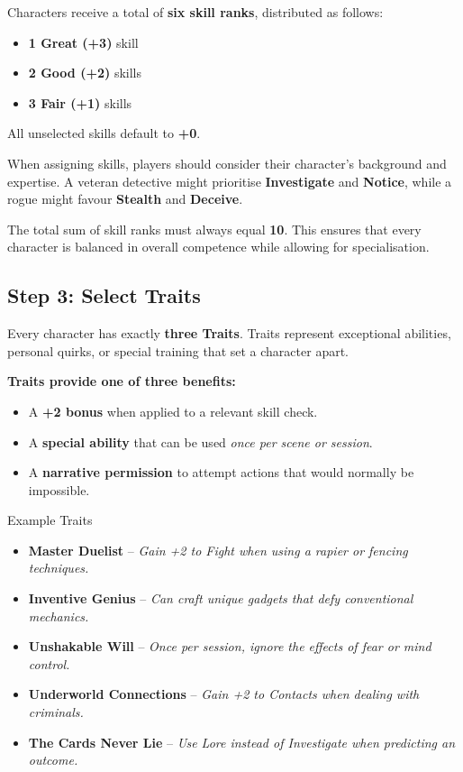 Characters receive a total of \textbf{six skill ranks}, distributed as follows:

\begin{itemize}
    \item \textbf{1 Great (+3)} skill
    \item \textbf{2 Good (+2)} skills
    \item \textbf{3 Fair (+1)} skills
\end{itemize}

All unselected skills default to \textbf{+0}.

\begin{DndReadAloud}{}
When assigning skills, players should consider their character’s background and expertise. A veteran detective might prioritise \textbf{Investigate} and \textbf{Notice}, while a rogue might favour \textbf{Stealth} and \textbf{Deceive}.
\end{DndReadAloud}

The total sum of skill ranks must always equal \textbf{10}. This ensures that every character is balanced in overall competence while allowing for specialisation.

\subsection{Step 3: Select Traits}

Every character has exactly \textbf{three Traits}. Traits represent exceptional abilities, personal quirks, or special training that set a character apart. 

\textbf{Traits provide one of three benefits:}
\begin{itemize}
    \item A \textbf{+2 bonus} when applied to a relevant skill check.
    \item A \textbf{special ability} that can be used \emph{once per scene or session}.
    \item A \textbf{narrative permission} to attempt actions that would normally be impossible.
\end{itemize}

\begin{DndSidebar}[float=!b]{Example Traits}
    \begin{itemize}
        \item \textbf{Master Duelist} – \emph{Gain +2 to Fight when using a rapier or fencing techniques.}
        \item \textbf{Inventive Genius} – \emph{Can craft unique gadgets that defy conventional mechanics.}
        \item \textbf{Unshakable Will} – \emph{Once per session, ignore the effects of fear or mind control.}
        \item \textbf{Underworld Connections} – \emph{Gain +2 to Contacts when dealing with criminals.}
        \item \textbf{The Cards Never Lie} – \emph{Use Lore instead of Investigate when predicting an outcome.}
    \end{itemize}
\end{DndSidebar}

